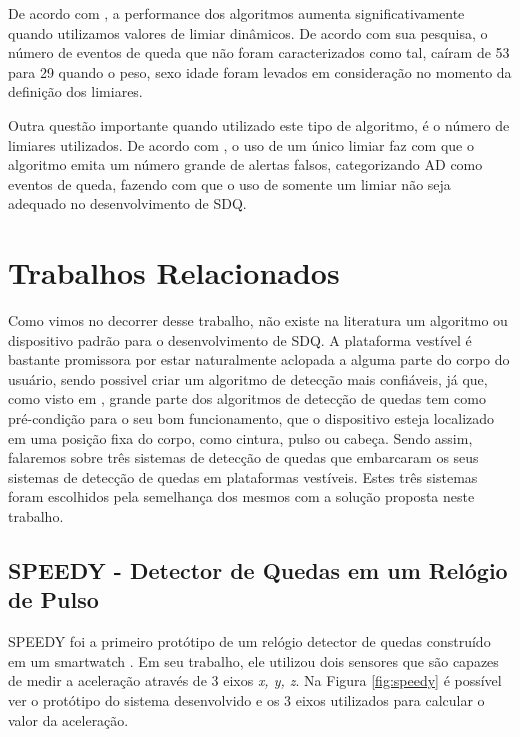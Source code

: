 De acordo com \cite{cao2012falld}, a performance dos algoritmos aumenta significativamente quando utilizamos valores de limiar dinâmicos. De acordo com sua pesquisa, o número de eventos de queda que não foram caracterizados como tal, caíram de 53 para 29 quando o peso, sexo idade foram levados em consideração no momento da definição dos limiares.

Outra questão importante quando utilizado este tipo de algoritmo, é o número de limiares utilizados. De acordo com \cite{casilari2015analysis}, o uso de um único limiar faz com que o algoritmo emita um número grande de alertas falsos, categorizando \ac{AD} como eventos de queda, fazendo com que o uso de somente um limiar não seja adequado no desenvolvimento de \ac{SDQ}.


\section{Trabalhos Relacionados}
\label{sec:FDS_examples}
Como vimos no decorrer desse trabalho, não existe na literatura um algoritmo ou dispositivo padrão para o desenvolvimento de \ac{SDQ}. A plataforma vestível é bastante promissora por estar naturalmente aclopada a alguma parte do corpo do usuário, sendo possivel criar um algoritmo de detecção mais confiáveis, já que, como visto em \cite{casilari2015analysis}, grande parte dos algoritmos de detecção de quedas tem como pré-condição para o seu bom funcionamento, que o dispositivo esteja localizado em uma posição fixa do corpo, como cintura, pulso ou cabeça. Sendo assim, falaremos sobre três sistemas de detecção de quedas que embarcaram os seus sistemas de detecção de quedas em plataformas vestíveis. Estes três sistemas foram escolhidos pela semelhança dos mesmos com a solução proposta neste trabalho.

\subsection{SPEEDY - Detector de Quedas em um Relógio de Pulso}
SPEEDY foi a primeiro protótipo de um relógio detector de quedas construído em um smartwatch \citep{degen2003speedy}. Em seu trabalho, ele  utilizou dois sensores que são capazes de medir a aceleração através de 3 eixos \textit{x, y, z}. Na Figura \ref{fig:speedy} é possível ver o protótipo do sistema desenvolvido e os 3 eixos utilizados para calcular o valor da aceleração. 

